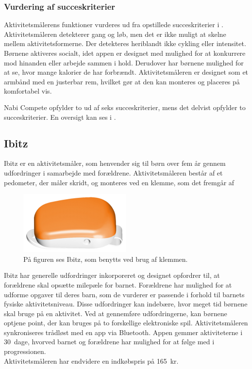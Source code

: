 \subsubsection{Vurdering af succeskriterier}
Aktivitetsmålerens funktioner vurderes ud fra opstillede succeskriterier i . \\
Aktivitetsmåleren detekterer gang og løb, men det er ikke muligt at skelne mellem aktivitetsformerne. Der detekteres heriblandt ikke cykling eller intensitet. Børnene aktiveres socialt, idet appen er designet med mulighed for at konkurrere mod hinanden eller arbejde sammen i hold. Derudover har børnene mulighed for %
at se, hvor mange kalorier de har forbrændt. Aktivitetsmåleren er designet som et armbånd med en justerbar rem, hvilket gør at den kan monteres og placeres på komfortabel vis.~\citep{Fuhu2015,Fuhu_tech2015}

Nabi Compete opfylder to ud af seks succeskriterier, mens det delvist opfylder to succeskriterier. En oversigt kan ses i .

\subsection{Ibitz}
Ibitz er en aktivitetsmåler, som henvender sig til børn over fem år gennem udfordringer i samarbejde med forældrene. Aktivitetsmåleren består af et pedometer, der måler skridt, og monteres ved en klemme, som det fremgår af 
\begin{figure}[H]
	\centering
	\includegraphics[scale=0.6]{figures/aProblemanalyse/ibitz.png}
	\caption{På figuren ses Ibitz, som benytts ved brug af klemmen.~\citep{Ibitz_features2016}}
	\label{fig:ibitz}
\end{figure}\vspace{-.25cm}
Ibitz har generelle udfordringer inkorporeret og designet opfordrer til, at forældrene skal opsætte milepæle for barnet. Forældrene har mulighed for at udforme opgaver til deres barn, som de vurderer er passende i forhold til barnets fysiske aktivitetsniveau. Disse udfordringer kan indebære, hvor meget tid børnene skal bruge på en aktivitet. Ved at gennemføre udfordringerne, kan børnene optjene point, der kan bruges på to forskellige elektroniske spil. \newline 
Aktivitetsmåleren synkroniseres trådløst med en app via Bluetooth. Appen gemmer aktiviteterne i 30~dage, hvorved barnet og forældrene har mulighed for at følge med i progressionen.\\
Aktivitetsmåleren har endvidere en indkøbspris på 165~kr.~\citep{Ibitz_features2016}


